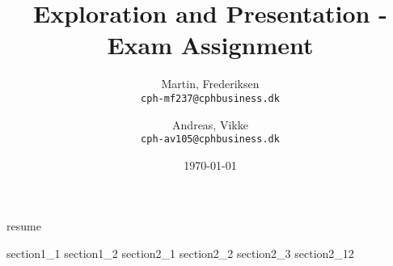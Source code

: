 \documentclass[10pt]{article}
\title{Exploration and Presentation - Exam Assignment}
\author{
    Martin, Frederiksen\\
    \texttt{cph-mf237@cphbusiness.dk}\\
    \and
    Andreas, Vikke\\
    \texttt{cph-av105@cphbusiness.dk}
  }
\date{\today}
\begin{document}
\hypersetup{pageanchor=false}
\maketitle
{resume}
\tableofcontents

\newpage
{section1_1}
{section1_2}
{section2_1}
{section2_2}
{section2_3}
{section2_12}



\end{document}
